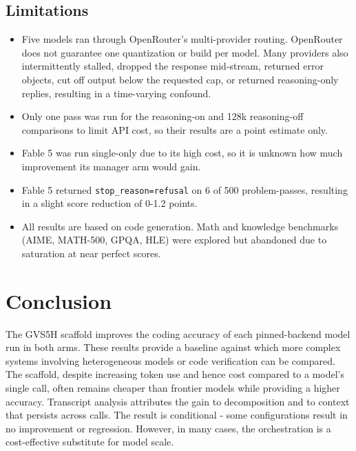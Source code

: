 \documentclass{article}
\begin{document}
\subsection{Limitations}
\label{sec:limitations}

\begin{itemize}
  \item Five models ran through OpenRouter's multi-provider routing. OpenRouter does
  not guarantee one quantization or build per model. Many providers also intermittently stalled, dropped the response
  mid-stream, returned error objects, cut off output below the requested cap, or returned
  reasoning-only replies, resulting in a time-varying confound.

  \item Only one pass was run for the reasoning-on and 128k
  reasoning-off comparisons to limit API cost, so their results are a point estimate only.

  \item Fable 5 was run single-only due to its high cost, so it is unknown how much improvement its manager arm would gain.

  \item Fable 5
  returned \texttt{stop\_reason=refusal} on 6 of 500 problem-passes, resulting in a slight score reduction of 0-1.2 points.

  \item All results are based on code
  generation. Math and knowledge benchmarks (AIME, MATH-500, GPQA, HLE) were explored but abandoned due to saturation at near perfect scores.
\end{itemize}

\section{Conclusion}
\label{sec:conclusion}

The GVS5H scaffold improves the coding accuracy of each pinned-backend model run in both arms. These results provide a baseline against which more complex systems involving heterogeneous models or code verification can be compared.
The scaffold, despite increasing token use and hence cost compared to a model's single call, often remains
cheaper than frontier models while providing a higher accuracy. Transcript analysis
attributes the gain to decomposition and to context that persists across calls.   The result is conditional - some configurations result in no improvement or regression. However, in many cases, the orchestration is a cost-effective substitute for model scale.
\end{document}
